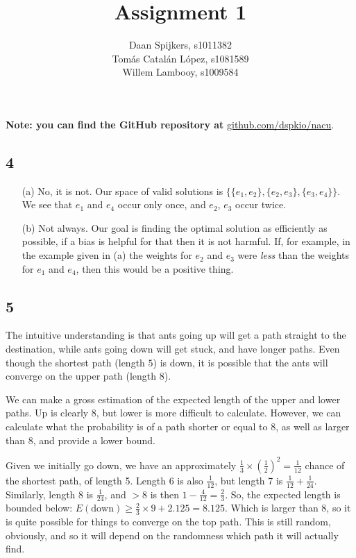 \documentclass{scrartcl}
\title{Assignment 1}
\author{Daan Spijkers, s1011382\\ Tomás Catalán López, s1081589\\ Willem Lambooy, s1009584}
\begin{document}
\maketitle

\textbf{Note: you can find the GitHub repository at}
\url{github.com/dspkio/nacu}.

\subsection*{4}

\begin{itemize}

  \item[(a)]
    No, it is not. Our space of valid solutions is $\{\{e_1, e_2\}, \{e_2,
    e_3\}, \{e_3, e_4\}\}$. We see that $e_1$ and $e_4$ occur only once,
    and $e_2$, $e_3$ occur twice.

  \item[(b)]
    Not always. Our goal is finding the optimal solution as efficiently as
    possible, if a bias is helpful for that then it is not harmful. If,
    for example, in the example given in (a) the weights for $e_2$ and
    $e_3$ were \emph{less} than the weights for $e_1$ and $e_4$, then this
    would be a positive thing.

\end{itemize}

\subsection*{5}
The intuitive understanding is that ants going up will get a path straight
to the destination, while ants going down will get stuck, and have longer
paths. Even though the shortest path (length $5$) is down, it is possible
that the ants will converge on the upper path (length $8$).

We can make a gross estimation of the expected length of the upper and
lower paths. Up is clearly 8, but lower is more difficult to calculate.
However, we can calculate what the probability is of a path shorter or
equal to 8, as well as larger than 8, and provide a lower bound.

Given we initially go down, we have an approximately $\frac{1}{3} \times
(\frac{1}{2})^2 = \frac{1}{12}$ chance of the shortest path, of length 5.
Length 6 is also $\frac{1}{12}$, but length 7 is $\frac{1}{12} +
\frac{1}{24}$. Similarly, length 8 is $\frac{1}{24}$, and $>8$ is then $1
- \frac{4}{12} = \frac{2}{3}$. So, the expected length is bounded below:
$E(\text{down}) \ge \frac{2}{3} \times 9 + 2.125 = 8.125$. Which is larger
than 8, so it is quite possible for things to converge on the top path.
This is still random, obviously, and so it will depend on the randomness
which path it will actually find.
\end{document}
